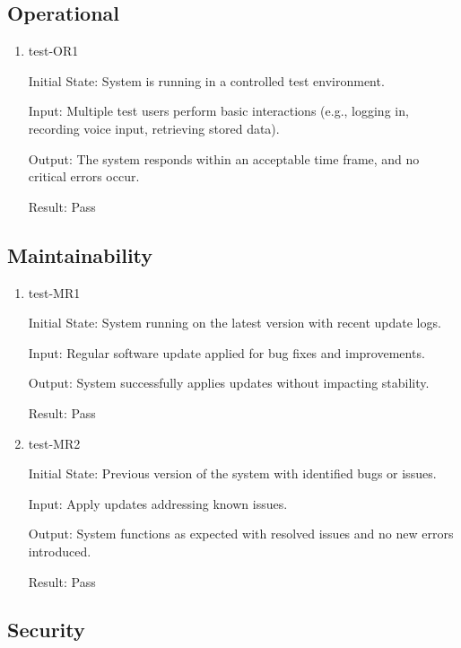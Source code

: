 \documentclass[12pt, titlepage]{article}
\begin{document}
\subsection{Operational} \label{section:4.4}

\begin{enumerate}
\item test-OR1 \label{test-OR1}

Initial State: System is running in a controlled test environment.

Input: Multiple test users perform basic interactions (e.g., logging in, recording voice input, retrieving stored data).

Output: The system responds within an acceptable time frame, and no critical errors occur.

Result: Pass

\end{enumerate}

\subsection{Maintainability} \label{section:4.5}

\begin{enumerate}
\item test-MR1 \label{test-MR1}

Initial State: System running on the latest version with recent update logs.

Input: Regular software update applied for bug fixes and improvements.

Output: System successfully applies updates without impacting stability.

Result: Pass

\item test-MR2 \label{test-MR2} 

Initial State: Previous version of the system with identified bugs or issues.

Input: Apply updates addressing known issues.

Output: System functions as expected with resolved issues and no new errors introduced.

Result: Pass

\end{enumerate}

\subsection{Security} \label{section:4.6}
\end{document}
